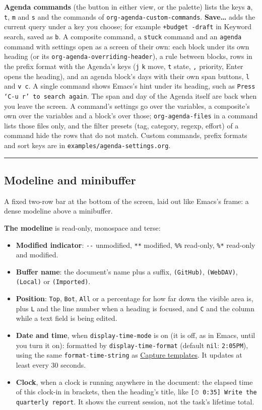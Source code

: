 \documentclass[11pt]{article}
\begin{document}
\textbf{Agenda commands} (the button in either view, or the palette) lists the keys \texttt{a}, \texttt{t}, \texttt{m} and \texttt{s} and the commands of \texttt{org-agenda-custom-commands}. \textbf{Save…} adds the current query under a key you choose; for example \texttt{+budget -draft} in Keyword search, saved as \texttt{b}. A composite command, a \texttt{stuck} command and an \texttt{agenda} command with settings open as a screen of their own: each block under its own heading (or its \texttt{org-agenda-overriding-header}), a rule between blocks, rows in the prefix format with the Agenda's keys (\texttt{j} \texttt{k} move, \texttt{t} state, \texttt{,} priority, Enter opens the heading), and an agenda block's days with their own span buttons, \texttt{l} and \texttt{v c}. A single command shows Emacs's hint under its heading, such as \texttt{Press `C-u r' to search again}. The span and day of the Agenda itself are back when you leave the screen. A command's settings go over the variables, a composite's own over the variables and a block's over those; \texttt{org-agenda-files} in a command lists those files only, and the filter presets (tag, category, regexp, effort) of a command hide the rows that do not match. Custom commands, prefix formats and sort keys are in \texttt{examples/agenda-settings.org}.

\noindent\rule{\textwidth}{0.5pt}

\subsection{Modeline and minibuffer}
\label{sec:org87b300e}
A fixed two-row bar at the bottom of the screen, laid out like Emacs's frame: a dense modeline above a minibuffer.

\textbf{The modeline} is read-only, monospace and terse:

\begin{itemize}
\item \textbf{Modified indicator}: \texttt{-{}-{}} unmodified, \texttt{**} modified, \texttt{\%\%} read-only, \texttt{\%*} read-only and modified.
\item \textbf{Buffer name}: the document's name plus a suffix, \texttt{(GitHub)}, \texttt{(WebDAV)}, \texttt{(Local)} or \texttt{(Imported)}.
\item \textbf{Position}: \texttt{Top}, \texttt{Bot}, \texttt{All} or a percentage for how far down the visible area is, plus \texttt{L} and the line number when a heading is focused, and \texttt{C} and the column while a text field is being edited.
\item \textbf{Date and time}, when \texttt{display-time-mode} is on (it is off, as in Emacs, until you turn it on): formatted by \texttt{display-time-format} (default \texttt{nil}: \texttt{2:05PM}), using the same \texttt{format-time-string} as \hyperref[sec:org0116725]{Capture templates}. It updates at least every 30 seconds.
\item \textbf{Clock}, when a clock is running anywhere in the document: the elapsed time of this clock-in in brackets, then the heading's title, like \texttt{[⏱ 0:35] Write the quarterly report}. It shows the current session, not the task's lifetime total.
\end{itemize}
\end{document}

